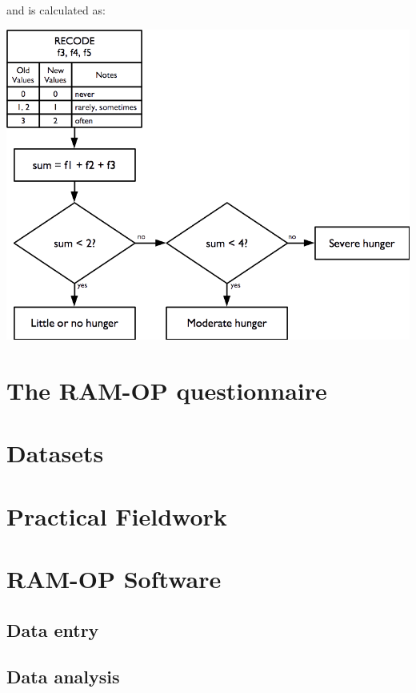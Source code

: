 \documentclass[12pt,a4paper]{book}
\theoremstyle{definition}
\theoremstyle{definition}
\theoremstyle{definition}
\theoremstyle{remark}
\begin{document}
and is calculated as:

\begin{center}\includegraphics{figures/indicators15} \end{center}

\hypertarget{the-ram-op-questionnaire}{%
\chapter{The RAM-OP questionnaire}\label{the-ram-op-questionnaire}}

\hypertarget{datasets}{%
\chapter{Datasets}\label{datasets}}

\hypertarget{practical}{%
\chapter{Practical Fieldwork}\label{practical}}

\hypertarget{software}{%
\chapter{RAM-OP Software}\label{software}}

\hypertarget{data-entry}{%
\section{Data entry}\label{data-entry}}

\hypertarget{data-analysis}{%
\section{Data analysis}\label{data-analysis}}
\end{document}
